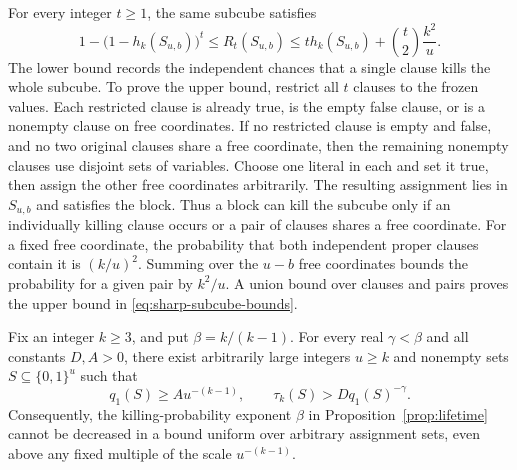 For every integer \(t\ge1\), the same subcube satisfies
\begin{equation}\label{eq:sharp-subcube-bounds}
 1-\bigl(1-h_k(S_{u,b})\bigr)^t
 \le R_t(S_{u,b})
 \le t h_k(S_{u,b})+\binom t2\frac{k^2}{u}.
\end{equation}
The lower bound records the independent chances that a single clause
kills the whole subcube.  To prove the upper bound, restrict all \(t\)
clauses to the frozen values.  Each restricted clause is already true,
is the empty false clause, or is a nonempty clause on free coordinates.
If no restricted clause is empty and false, and no two original clauses
share a free coordinate, then the remaining nonempty clauses use
disjoint sets of variables.  Choose one literal in each and set it true,
then assign the other free coordinates arbitrarily.  The resulting
assignment lies in \(S_{u,b}\) and satisfies the block.
Thus a block can kill the subcube only if an individually killing clause
occurs or a pair of clauses shares a free coordinate.  For a fixed
free coordinate, the probability that both independent proper clauses
contain it is \((k/u)^2\).  Summing over the \(u-b\) free coordinates
bounds the probability for a given pair by \(k^2/u\).  A union bound over
clauses and pairs proves the upper bound in
\eqref{eq:sharp-subcube-bounds}.

\begin{proposition}
\label{prop:lifetime-sharp}
Fix an integer \(k\ge3\), and put \(\beta=k/(k-1)\).  For every real
\(\gamma<\beta\) and all constants \(D,A>0\), there exist arbitrarily
large integers \(u\ge k\) and nonempty sets
\(S\subseteq\{0,1\}^u\) such that
\[
 q_1(S)\ge A u^{-(k-1)},\qquad
 \tau_k(S)>Dq_1(S)^{-\gamma}.
\]
Consequently, the killing-probability exponent \(\beta\) in
Proposition~\ref{prop:lifetime} cannot be decreased in a bound uniform
over arbitrary assignment sets,
even above any fixed multiple of the scale \(u^{-(k-1)}\).
\end{proposition}

